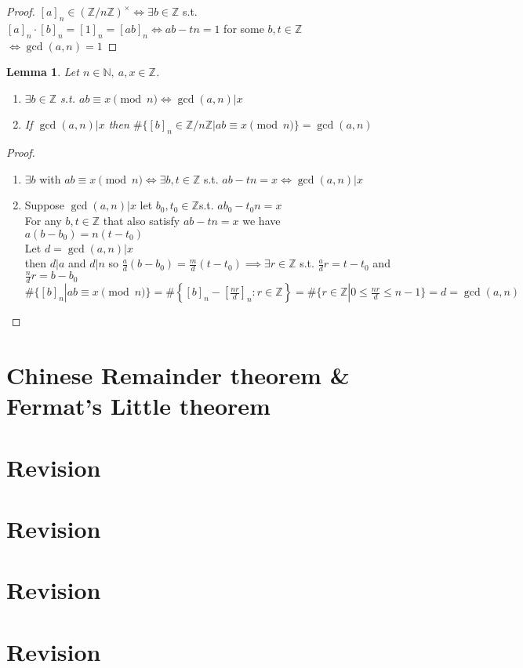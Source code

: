 \documentclass{article}
\newtheorem*{lem}{Lemma}
\theoremstyle{definition}
\newcommand{\ZZ}{\mathbb{Z}}
\newcommand{\NN}{\mathbb{N}}
\begin{document}
\begin{proof}
$[a]_n\in (\ZZ /n\ZZ)^\times \iff \exists b \in \ZZ$ s.t. $[a]_n\cdot [b]_n=[1]_n=[ab]_n \iff ab-tn=1$ for some $b,t\in\ZZ$ $\iff \gcd(a,n)=1$
\end{proof}
\begin{lem}
Let $n\in\NN ,\ a,x \in\ZZ$.
\begin{enumerate}
\item $\exists b \in\ZZ$ s.t. $ab \equiv x\pmod{n} \iff \gcd(a,n)|x$
\item If $\gcd(a,n)|x$ then $\#\{[b]_n\in\ZZ/n\ZZ|ab\equiv x\pmod{n}\} =\gcd(a,n)$
\end{enumerate}
\end{lem}
\begin{proof}
\begin{enumerate}
\item $\exists b$ with $ab \equiv x\pmod{n} \iff \exists b,t \in\ZZ$ s.t. $ab-tn=x \iff \gcd(a,n)|x$
\item Suppose $\gcd(a,n)|x$ let $b_0, t_0\in\ZZ$s.t. $ab_0-t_0n=x$ \\
For any $b,t\in\ZZ$ that also satisfy $ab-tn=x$ we have $a(b-b_0)=n(t-t_0)$ \\
Let $d=\gcd(a,n)|x$ \\
then $d|a$ and $d|n$ so $\frac a d (b-b_0)=\frac m d (t-t_0) \implies \exists r \in\ZZ$ s.t. $\frac a d r = t-t_0$ and $\frac n d r = b-b_0$ \\
$\#\{[b]_n|ab\equiv x \pmod{n}\} = \#\left\{[b]_n - \left[ \frac{nr}{d}\right]_n : r\in\ZZ\right\} = \#\{r\in\ZZ|0\leq \frac{nr}{d} \leq n-1\} = d = \gcd(a,n)$
\end{enumerate}
\end{proof}
\section{Chinese Remainder theorem \& Fermat's Little theorem}

\section{Revision}

\section{Revision}

\section{Revision}

\section{Revision}
\end{document}

